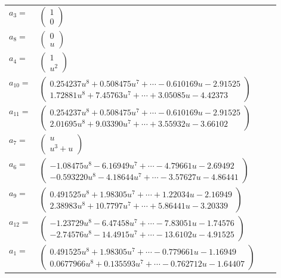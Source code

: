 \documentclass[1p]{elsarticle_modified}
\theoremstyle{definition}
\begin{document}
\begin{tabular}{m{7pt} m{180pt} m{7pt} m{180pt} }
\flushright $a_{3}=$&$\begin{pmatrix}1\\0\end{pmatrix}$ \\
\flushright $a_{8}=$&$\begin{pmatrix}0\\u\end{pmatrix}$ \\
\flushright $a_{4}=$&$\begin{pmatrix}1\\u^2\end{pmatrix}$ \\
\flushright $a_{10}=$&$\begin{pmatrix}0.254237 u^{8}+0.508475 u^{7}+\cdots-0.610169 u-2.91525\\1.72881 u^{8}+7.45763 u^{7}+\cdots+3.05085 u-4.42373\end{pmatrix}$ \\
\flushright $a_{11}=$&$\begin{pmatrix}0.254237 u^{8}+0.508475 u^{7}+\cdots-0.610169 u-2.91525\\2.01695 u^{8}+9.03390 u^{7}+\cdots+3.55932 u-3.66102\end{pmatrix}$ \\
\flushright $a_{7}=$&$\begin{pmatrix}u\\u^3+u\end{pmatrix}$ \\
\flushright $a_{6}=$&$\begin{pmatrix}-1.08475 u^{8}-6.16949 u^{7}+\cdots-4.79661 u-2.69492\\-0.593220 u^{8}-4.18644 u^{7}+\cdots-3.57627 u-4.86441\end{pmatrix}$ \\
\flushright $a_{9}=$&$\begin{pmatrix}0.491525 u^{8}+1.98305 u^{7}+\cdots+1.22034 u-2.16949\\2.38983 u^{8}+10.7797 u^{7}+\cdots+5.86441 u-3.20339\end{pmatrix}$ \\
\flushright $a_{12}=$&$\begin{pmatrix}-1.23729 u^{8}-6.47458 u^{7}+\cdots-7.83051 u-1.74576\\-2.74576 u^{8}-14.4915 u^{7}+\cdots-13.6102 u-4.91525\end{pmatrix}$ \\
\flushright $a_{1}=$&$\begin{pmatrix}0.491525 u^{8}+1.98305 u^{7}+\cdots-0.779661 u-1.16949\\0.0677966 u^{8}+0.135593 u^{7}+\cdots-0.762712 u-1.64407\end{pmatrix}$ \\

\end{tabular}
\end{document}

